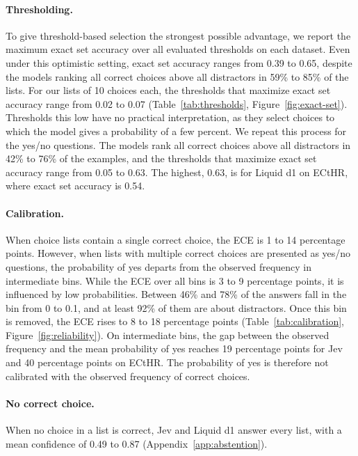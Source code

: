 \paragraph{Thresholding.}
To give threshold-based selection the strongest possible advantage, we report the maximum exact set accuracy over all evaluated thresholds on each dataset. Even under this optimistic setting, exact set accuracy ranges from 0.39 to 0.65, despite the models ranking all correct choices above all distractors in 59\% to 85\% of the lists. For our lists of 10 choices each, the thresholds that maximize exact set accuracy range from 0.02 to 0.07 (Table~\ref{tab:thresholds}, Figure~\ref{fig:exact-set}). Thresholds this low have no practical interpretation, as they select choices to which the model gives a probability of a few percent. We repeat this process for the yes/no questions. The models rank all correct choices above all distractors in 42\% to 76\% of the examples, and the thresholds that maximize exact set accuracy range from 0.05 to 0.63. The highest, 0.63, is for Liquid d1 on ECtHR, where exact set accuracy is 0.54.

\paragraph{Calibration.}
When choice lists contain a single correct choice, the ECE is 1 to 14 percentage points. However, when lists with multiple correct choices are presented as yes/no questions, the probability of yes departs from the observed frequency in intermediate bins. While the ECE over all bins is 3 to 9 percentage points, it is influenced by low probabilities. Between 46\% and 78\% of the answers fall in the bin from 0 to 0.1, and at least 92\% of them are about distractors. Once this bin is removed, the ECE rises to 8 to 18 percentage points (Table~\ref{tab:calibration}, Figure~\ref{fig:reliability}). On intermediate bins, the gap between the observed frequency and the mean probability of yes reaches 19 percentage points for Jev and 40 percentage points on ECtHR. The probability of yes is therefore not calibrated with the observed frequency of correct choices.

\paragraph{No correct choice.}
When no choice in a list is correct, Jev and Liquid d1 answer every list, with a mean confidence of 0.49 to 0.87 (Appendix~\ref{app:abstention}).

\FloatBarrier
